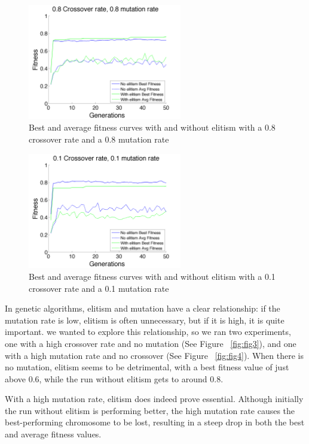 \documentclass[11pt]{article}
\begin{document}
\begin{figure}[H]
 \centering
  \includegraphics[width=0.6\textwidth,height=0.2\textheight]{figures/fitness08mut08cross.png}
  \caption{Best and average fitness curves with and without elitism with a 0.8 crossover rate and a 0.8 mutation rate}
  \label{fig:fig1}  
\end{figure} 

\begin{figure}[H]
 \centering
  \includegraphics[width=0.6\textwidth,height=0.2\textheight]{figures/fitness01mut01cross.png}
  \caption{Best and average fitness curves with and without elitism with a 0.1 crossover rate and a 0.1 mutation rate}
  \label{fig:fig2}  
\end{figure}

In genetic algorithms, elitism and mutation have a clear relationship: if the mutation rate is low, elitism is often unnecessary, but if it is high, it is quite important. we wanted to explore this relationship, so we ran two experiments, one with a high crossover rate and no mutation (See Figure ~\ref{fig:fig3}), and one with a high mutation rate and no crossover (See Figure ~\ref{fig:fig4}). When there is no mutation, elitism seems to be detrimental, with a best fitness value of just above 0.6, while the run without elitism gets to around 0.8. 

With a high mutation rate, elitism does indeed prove essential. Although initially the run without elitism is performing better, the high mutation rate causes the best-performing chromosome to be lost, resulting in a steep drop in both the best and average fitness values.
 
\end{document}
